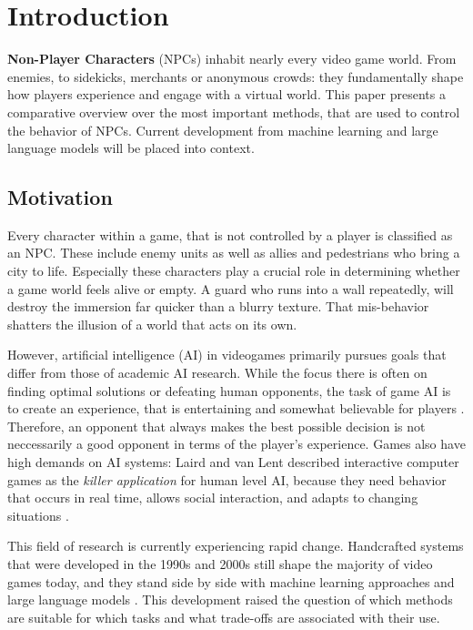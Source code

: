 \ifCLASSOPTIONcompsoc
{}
\else
\section{Introduction}
\label{sec:introduction}
\fi


\textbf{Non-Player Characters} (NPCs) inhabit nearly every video game world. From enemies, to sidekicks, merchants or anonymous crowds: they fundamentally shape how players experience and engage with a virtual world. This paper presents a comparative overview over the most important methods, that are used to control the behavior of NPCs. Current development from machine learning and large language models will be placed into context.

\subsection{Motivation}

Every character within a game, that is not controlled by a player is classified as an NPC. These include enemy units as well as allies and pedestrians who bring a city to life. Especially these characters play a crucial role in determining whether a game world feels alive or empty. A guard who runs into a wall repeatedly, will destroy the immersion far quicker than a blurry texture. That mis-behavior shatters the illusion of a world that acts on its own.

However, artificial intelligence (AI) in videogames primarily pursues goals that differ from those of academic AI research. While the focus there is often on finding optimal solutions or defeating human opponents, the task of game AI is to create an experience, that is entertaining and somewhat believable for players \cite{yannakakis2018,millington2009}. Therefore, an opponent that always makes the best possible decision is not neccessarily a good opponent in terms of the player's experience. Games also have high demands on AI systems: Laird and van Lent described interactive computer games as the \emph{killer application} for human level AI, because they need behavior that occurs in real time, allows social interaction, and adapts to changing situations \cite{laird2001}.

This field of research is currently experiencing rapid change. Handcrafted systems that were developed in the 1990s and 2000s still shape the majority of video games today, and they stand side by side with machine learning approaches and large language models \cite{gallotta2024}. This development raised the question of which methods are suitable for which tasks and what trade-offs are associated with their use.

